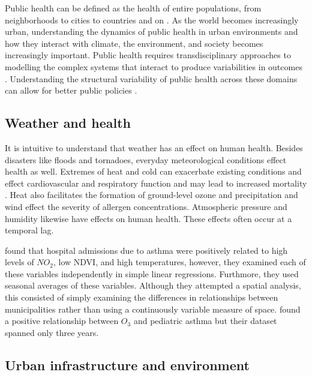 Public health can be defined as the health of entire populations, from neighborhoods to cities to countries and on \citep{Trochim2006}.
As the world becomes increasingly urban, understanding the dynamics of public health in urban environments and how they interact with climate, the environment, and society becomes increasingly important.
Public health requires transdisciplinary approaches to modelling the complex systems that interact to produce variabilities in outcomes \citep{Trochim2006}.
Understanding the structural variability of public health across these domains can allow for better public policies \citep{McPhearson2016}.

\subsection{Weather and health}

It is intuitive to understand that weather has an effect on human health.
Besides disasters like floods and tornadoes, everyday meteorological conditions effect health as well.
Extremes of heat and cold can exacerbate existing conditions and effect cardiovascular and respiratory function and may lead to increased mortality \citep{ferreirabragaTimeCourseWeatherRelated2001}.
Heat also facilitates the formation of ground-level ozone and precipitation and wind effect the severity of allergen concentrations.
Atmospheric pressure and humidity likewise have effects on human health.
These effects often occur at a temporal lag.

\citet{Ayres-Sampaio2014} found that hospital admissions due to asthma were positively related to high levels of $NO_2$, low NDVI, and high temperatures, however, they examined each of these variables independently in simple linear regressions.
Furthmore, they used seasonal averages of these variables.
Although they attempted a spatial analysis, this consisted of simply examining the differences in relationships between municipalities rather than using a continuously variable measure of space.
\citet{babinPediatricPatientAsthmarelated2007} found a positive relationship between $O_3$ and pediatric asthma but their dataset spanned only three years.

\subsection{Urban infrastructure and environment}

